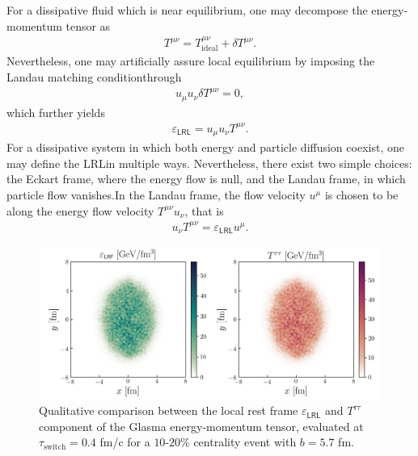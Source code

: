 \begin{note}
For a dissipative fluid which is near equilibrium, one may decompose the energy-momentum tensor as
\begin{align*}
    T^{\mu\nu}=T^{\mu\nu}_\text{ideal}+\delta T^{\mu\nu}.
\end{align*}
Nevertheless, one may artificially assure local equilibrium by imposing the Landau matching conditionthrough
\begin{align*}
    u_\mu u_\nu \delta T^{\mu\nu}=0,
\end{align*}
which further yields
\begin{align*}
    \varepsilon_\textsf{LRL}=u_\mu u_\nu T^{\mu\nu}.
\end{align*}
For a dissipative system in which both energy and particle diffusion coexist, one may define the {\sffamily LRL}in multiple ways. Nevertheless, there exist two simple choices: the Eckart frame, where the energy flow is null, and the Landau frame, in which particle flow vanishes.In the Landau frame, the flow velocity $u^\mu$ is chosen to be along the energy flow velocity $T^{\mu\nu}u_\nu$, that is
\begin{align*}
    u_\nu T^{\mu\nu}=\varepsilon_\textsf{LRL}u^\mu.
\end{align*}
\end{note}

\begin{figure}[h!]
	\includegraphics{images/ed_lrl_lab_auau_200_dpi_300.png}
	\caption{\normalsize Qualitative comparison between the local rest frame $\varepsilon_\textsf{LRL}$ and $T^{\tau\tau}$ component of the Glasma energy-momentum tensor, evaluated at $\tau_\mathrm{switch}=0.4$ fm/c for a $10$-$20\%$ centrality event with $b=5.7$ fm.}
\end{figure}

